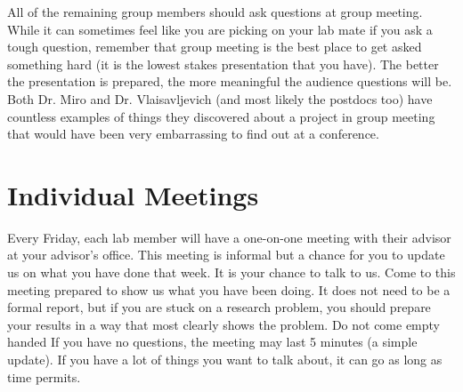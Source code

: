 \documentclass[letterpaper]{article}
\begin{document}
All of the remaining group members should ask questions at group meeting. While it can sometimes feel like you are picking on your lab mate if you ask a tough question, remember that group meeting is the best place to get asked something hard (it is the lowest stakes presentation that you have). The better the presentation is prepared, the more meaningful the audience questions will be. Both Dr. Miro and Dr. Vlaisavljevich (and most likely the postdocs too) have countless examples of things they discovered about a project in group meeting that would have been very embarrassing to find out at a conference.  %

\section*{Individual Meetings}
Every Friday, each lab member will have a one-on-one meeting with their advisor at your advisor's office. This meeting is informal but a chance for you to update us on what you have done that week. It is your chance to talk to us. Come to this meeting prepared to show us what you have been doing. It does not need to be a formal report, but if you are stuck on a research problem, you should prepare your results in a way that most clearly shows the problem. Do not come empty handed If you have no questions, the meeting may last 5 minutes (a simple update). If you have a lot of things you want to talk about, it can go as long as time permits.
\end{document}
